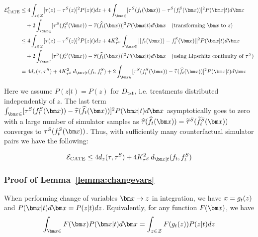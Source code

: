 {\begin{align*}
    \ErrITE^t &\leq 4\int_{z \in \Zspace} [\tau(z) - \syntau(z)]^2P(z|t)dz + 4\int_{\xb \in \xspace}[\syntau(\RInv_t(\xb)) - \syntau(\SInv_t(\xb))]^2P(\xb|t)d\xb \\&\quad+ 2\int_{\xb \in \xspace}[\syntau(\SInv_t(\xb)) - \tauhat(\RInvhat_t(\xb))]^2 P(\xb|t)d\xb \quad \text{(transforming $\xb$ to $z$)}\\
    &\leq 4\int_{z \in \Zspace} [\tau(z) - \syntau(z)]^2P(z|t)dz + 4 K_{\syntau}^2\int_{\xb \in \xspace}||\RInv_t(\xb)) - \SInv_t(\xb)||^2P(\xb|t)d\xb \\&\quad+ 2\int_{\xb \in \xspace}[\syntau(\SInv_t(\xb)) - \tauhat(\RInvhat_t(\xb))]^2 P(\xb|t)d\xb \quad \text{(using Lipschitz continuity of $\syntau$)}\\
    &= 4 d_{z}(\tau, \syntau) + 4 K_{\syntau}^2 \, d_{\xb|t}(\RInv_t, \SInv_t) + 2\int_{\xb \in \xspace}[\syntau(\SInv_t(\xb)) - \tauhat(\RInvhat_t(\xb))]^2 P(\xb|t)d\xb\\
\end{align*}

Here we assume $P(z|t) = P(z)$ for $D_{\text{tst}}$, i.e. treatments distributed independently of $z$. The last term $\int_{\xb \in \xspace}[\syntau(\SInv_t(\xb)) - \tauhat(\RInvhat_t(\xb))]^2 P(\xb|t)d\xb$ asymptotically goes to zero with a large number of simulator samples as $\tauhat(\RInvhat_t(\xb)) = \syntauTilde(\SInvTilde_t(\xb))$ converges to $\syntau(\SInv_t(\xb))$. Thus, with sufficiently many counterfactual simulator pairs we have the following:

\begin{align*}
    \ErrITE \leq 4 d_{z}(\tau, \syntau) + 4 K_{\syntau}^2 \, d_{\xb|t}(\RInv_t, \SInv_t)
\end{align*}

}


\subsubsection{Proof of Lemma~\ref{lemma:changevars}}
\label{app:lemma:changevars}
    When performing change of variables $\xb \to z$ in integration, we have $x = g_t(z)$ and $P(\xb|t)d\xb = P(z|t)dz$. Equivalently, for any function $F(\xb)$, we have 
    \begin{align*}
        \int_{\xb \in \xspace}F(\xb)P(\xb|t)d\xb = \int_{z \in \Zspace} F(\R_t(z))P(z|t)dz
    \end{align*}  

